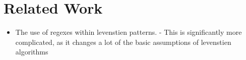 
\section{Related Work}
\label{sec:related-work}

\begin{itemize}
\item The use of regexes within levenstien patterns. - This is significantly more complicated, as it changes a lot of the basic assumptions of levenstien algorithms
\end{itemize}

